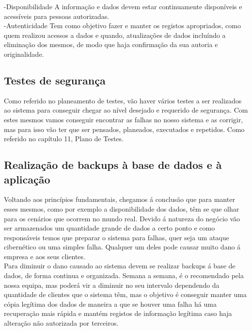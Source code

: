 -Disponibilidade
A informação e dados devem estar continuamente disponíveis e acessíveis para pessoas autorizadas.\\

-Autenticidade
Tem como objetivo fazer e manter os registos apropriados, como quem realizou acessos a dados e quando, atualizações de dados incluíndo a eliminação dos mesmos, de modo que haja confirmação da sua autoria e originalidade.


\subsection{Testes de segurança}
Como referido no planeamento de testes, vão haver vários testes a ser realizados ao sistema para conseguir chegar ao nível desejado e requerido de segurança. Com estes mesmos vamos conseguir encontrar as falhas no nosso sistema e as corrigir, mas para isso vão ter que ser pensados, planeados, executados e repetidos. Como referido no capítulo 11, Plano de Testes.\\

\subsection{Realização de backups à base de dados e à aplicação}
Voltando aos princípios fundamentais, chegamos á conclusão que para manter esses mesmos, como por exemplo a disponibilidade dos dados, têm se que olhar para os cenários que ocorrem no mundo real. Devido á natureza do negócio vão ser armazenados um quantidade grande de dados a certo ponto e como responsáveis temos que preparar o sistema para falhas, quer seja um ataque cibernético ou uma simples falha. Qualquer um deles pode causar muito dano á empresa e aos seus clientes.\\
Para diminuir o dano causado ao sistema devem se realizar backups á base de dados, de forma continua e organizada. Semana a semana, é o recomendado pela nossa equipa, mas poderá vir a diminuir no seu intervalo dependendo da quantidade de clientes que o sistema têm, mas o objetivo é conseguir manter uma cópia legítima dos dados de maneira a que se houver uma falha há uma recuperação mais rápida e mantém registos de informação legítima caso haja alteração não autorizada por terceiros.